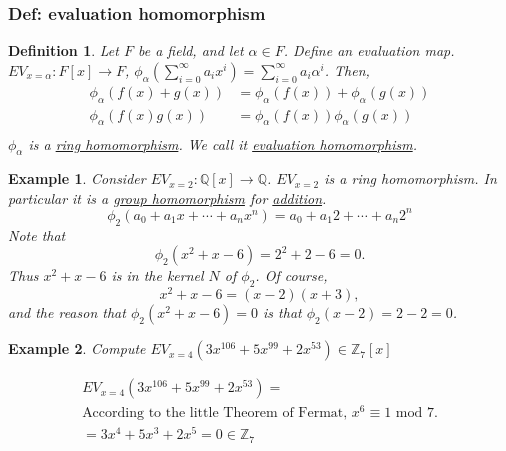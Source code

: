 \documentclass[11pt,a4paper]{article}
\newtheorem{example}{Example}
\newtheorem{definition}{Definition}
\begin{document}
\subsubsection{Def: evaluation homomorphism}
\begin{definition}
    Let $F$ be a field, and let $\alpha\in F$. Define an evaluation map. $EV_{x=\alpha}:F[x] \rightarrow F$, $\phi_\alpha(\sum_{i=0}^\infty a_ix^i)=\sum_{i=0}^\infty a_i\alpha^i$. Then,
    \begin{equation}
        \begin{aligned}
            \phi_\alpha(f(x)+g(x))&=\phi_\alpha(f(x))+\phi_\alpha(g(x))\\
            \phi_\alpha(f(x)g(x))&=\phi_\alpha(f(x))\phi_\alpha(g(x))\\
        \end{aligned}
        \nonumber
    \end{equation}
    $\phi_\alpha$ is a \underline{ring homomorphism}. We call it \underline{evaluation homomorphism}.
\end{definition}

\begin{example}
    Consider $EV_{x=2}: \mathbb{Q}[x] \rightarrow \mathbb{Q}$. $EV_{x=2}$ is a ring homomorphism. In particular it is a \underline{group homomorphism} for \underline{addition}.
    $$
    \phi_{2}\left(a_{0}+a_{1} x+\cdots+a_{n} x^{n}\right)=a_{0}+a_{1} 2+\cdots+a_{n} 2^{n}
    $$
    Note that
    $$
    \phi_{2}\left(x^{2}+x-6\right)=2^{2}+2-6=0 .
    $$
    Thus $x^{2}+x-6$ is in the kernel $N$ of $\phi_{2}$. Of course,
    $$
    x^{2}+x-6=(x-2)(x+3),
    $$
    and the reason that $\phi_{2}\left(x^{2}+x-6\right)=0$ is that $\phi_{2}(x-2)=2-2=0$.
\end{example}

\begin{example}
    Compute $EV_{x=4}(3x^{106}+5x^{99}+2x^{53})\in \mathbb{Z}_7[x]$

    \begin{equation}
        \begin{aligned}
            EV_{x=4}(3x^{106}+5x^{99}+2x^{53})=\\
            \text{According to the little Theorem of Fermat, $x^6\equiv 1 \text{ mod }7$.}\\
            =3x^4+5x^3+2x^5=0\in \mathbb{Z}_7
        \end{aligned}
        \nonumber
    \end{equation}
\end{example}
\end{document}
